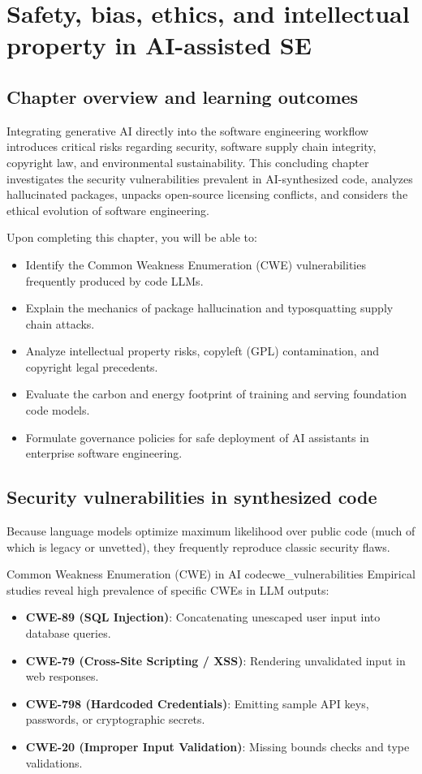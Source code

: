 \documentclass[../../main.tex]{subfiles}
\begin{document}
\chapter{Safety, bias, ethics, and intellectual property in AI-assisted SE}
\label{ch:safety_bias_ethics_ip}

\section{Chapter overview and learning outcomes}
Integrating generative AI directly into the software engineering workflow introduces critical risks regarding security, software supply chain integrity, copyright law, and environmental sustainability. This concluding chapter investigates the security vulnerabilities prevalent in AI-synthesized code, analyzes hallucinated packages, unpacks open-source licensing conflicts, and considers the ethical evolution of software engineering.

Upon completing this chapter, you will be able to:
\begin{itemize}
    \item Identify the Common Weakness Enumeration (CWE) vulnerabilities frequently produced by code LLMs.
    \item Explain the mechanics of package hallucination and typosquatting supply chain attacks.
    \item Analyze intellectual property risks, copyleft (GPL) contamination, and copyright legal precedents.
    \item Evaluate the carbon and energy footprint of training and serving foundation code models.
    \item Formulate governance policies for safe deployment of AI assistants in enterprise software engineering.
\end{itemize}

\section{Security vulnerabilities in synthesized code}
Because language models optimize maximum likelihood over public code (much of which is legacy or unvetted), they frequently reproduce classic security flaws.

\begin{definition}{Common Weakness Enumeration (CWE) in AI code}{cwe_vulnerabilities}
Empirical studies reveal high prevalence of specific CWEs in LLM outputs:
\begin{itemize}
    \item \textbf{CWE-89 (SQL Injection)}: Concatenating unescaped user input into database queries.
    \item \textbf{CWE-79 (Cross-Site Scripting / XSS)}: Rendering unvalidated input in web responses.
    \item \textbf{CWE-798 (Hardcoded Credentials)}: Emitting sample API keys, passwords, or cryptographic secrets.
    \item \textbf{CWE-20 (Improper Input Validation)}: Missing bounds checks and type validations.
\end{itemize}
\end{definition}
\end{document}
